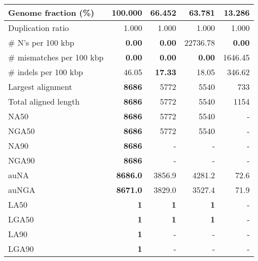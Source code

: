 \documentclass[12pt,a4paper]{article}
\begin{document}
\begin{table}[ht]
\begin{center}
\begin{tabular}{|l*{4}{|r}|}
Genome fraction (\%) & {\bf 100.000} & 66.452 & 63.781 & 13.286 \\ \hline
Duplication ratio & 1.000 & 1.000 & 1.000 & 1.000 \\ \hline
\# N's per 100 kbp & {\bf 0.00} & {\bf 0.00} & 22736.78 & {\bf 0.00} \\ \hline
\# mismatches per 100 kbp & {\bf 0.00} & {\bf 0.00} & {\bf 0.00} & 1646.45 \\ \hline
\# indels per 100 kbp & 46.05 & {\bf 17.33} & 18.05 & 346.62 \\ \hline
Largest alignment & {\bf 8686} & 5772 & 5540 & 733 \\ \hline
Total aligned length & {\bf 8686} & 5772 & 5540 & 1154 \\ \hline
NA50 & {\bf 8686} & 5772 & 5540 & - \\ \hline
NGA50 & {\bf 8686} & 5772 & 5540 & - \\ \hline
NA90 & {\bf 8686} & - & - & - \\ \hline
NGA90 & {\bf 8686} & - & - & - \\ \hline
auNA & {\bf 8686.0} & 3856.9 & 4281.2 & 72.6 \\ \hline
auNGA & {\bf 8671.0} & 3829.0 & 3527.4 & 71.9 \\ \hline
LA50 & {\bf 1} & {\bf 1} & {\bf 1} & - \\ \hline
LGA50 & {\bf 1} & {\bf 1} & {\bf 1} & - \\ \hline
LA90 & {\bf 1} & - & - & - \\ \hline
LGA90 & {\bf 1} & - & - & - \\ \hline
\end{tabular}
\end{center}
\end{table}
\end{document}
